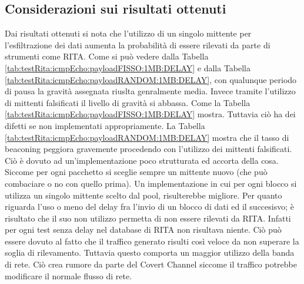 \subsection{Considerazioni sui risultati ottenuti}
Dai risultati ottenuti si nota che l'utilizzo di un singolo mittente per 
l'esfiltrazione dei dati aumenta la probabilità di essere rilevati da 
parte di strumenti come RITA. 
Come si può vedere dalla Tabella \ref{tab:testRita:icmpEcho:payloadFISSO:1MB:DELAY} 
e dalla Tabella \ref{tab:testRita:icmpEcho:payloadRANDOM:1MB:DELAY}, con 
qualunque periodo di pausa la gravità assegnata riuslta genralmente media.  
\vspace{3ex} \newline 
Invece tramite l'utilizzo di mittenti falsificati il livello di gravità si 
abbassa. Come la Tabella \ref{tab:testRita:icmpEcho:payloadFISSO:1MB:DELAY} mostra. 
\vspace{1ex} \newline 
Tuttavia ciò ha dei difetti se non implementati appropriamente. 
La Tabella \ref{tab:testRita:icmpEcho:payloadRANDOM:1MB:DELAY} mostra che il 
tasso di beaconing peggiora gravemente procedendo con l'utilizzo dei 
mittenti falsificati. Ciò è dovuto ad un'implementazione poco strutturata 
ed accorta della cosa.  
Siccome per ogni pacchetto si sceglie sempre un mittente nuovo (che può combaciare 
o no con quello prima). Un implementazione in cui per ogni blocco si utilizza 
un singolo mittente scelto dal pool, risulterebbe migliore. 
\vspace{3ex} \newline  
Per quanto riguarda l'uso o meno del delay fra l'invio di un blocco di dati 
ed il succesisvo; è risultato che il suo non utilizzo permetta di non essere 
rilevati da RITA. Infatti per ogni test senza delay nel database di RITA non 
risultava niente. 
\vspace{1ex} \newline 
Ciò può essere dovuto al fatto che il traffico generato risulti così veloce 
da non superare la soglia di rilevamento. Tuttavia questo comporta un 
maggior utilizzo della banda di rete. Ciò crea rumore da parte del Covert 
Channel siccome il traffico potrebbe modificare il normale flusso di rete. 





